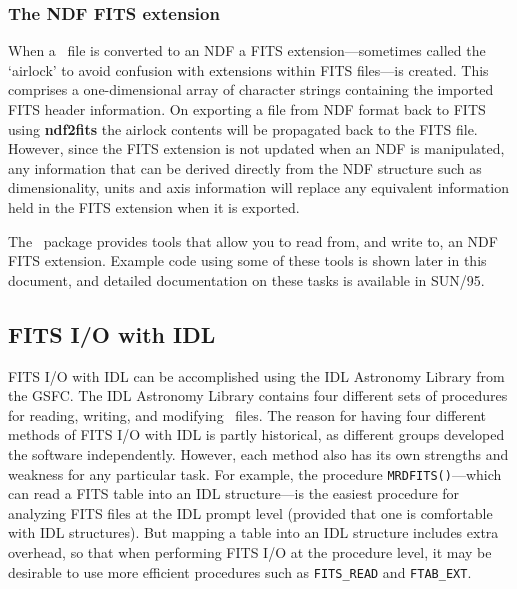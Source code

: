 \documentclass[twoside,11pt]{article}
\newcommand{\htmladdnormallink}[2]{#1}
\newcommand{\htmlref}[2]{#1}
\newcommand{\xref}[3]{#1}
\newcommand{\xlabel}[1]{}
\begin{document}
\subsubsection{The NDF FITS extension}

When a \FITSref\ file is converted to an \xref{NDF}{sun33}{} a FITS
extension---sometimes called the `airlock' to avoid confusion with
extensions within FITS files---is created.  This comprises a
one-dimensional array of character strings containing the imported
FITS header information.  On exporting a file from NDF format back to
FITS using \xref{{\bf ndf2fits}}{sun55}{NDF2FITS} the airlock contents
will be propagated back to the FITS file.  However, since the FITS
extension is not updated when an NDF is manipulated, any information
that can be derived directly from the NDF structure such as
dimensionality, units and axis information will replace any equivalent
information held in the FITS extension when it is exported.

The \KAPPAref\ package provides tools that allow you to read from, and
write to, an NDF FITS extension.  Example code using some of these
tools is shown later in this
\htmlref{document}{sc16_fitsheader}, and detailed documentation on these
tasks is available in \xref{SUN/95}{sun95}{se_fitsairlock}.

\subsection{\xlabel{sc16_fitsidl}FITS I/O with IDL\label{sc16_fitsidl}}

\htmladdnormallink{FITS
I/O}{http://idlastro.gsfc.nasa.gov/fitsio.html} with IDL can be
accomplished using the \htmladdnormallink{IDL Astronomy
Library}{http://idlastro.gsfc.nasa.gov/homepage.html} from the GSFC.
The IDL Astronomy Library contains four different sets of procedures
for reading, writing, and modifying \FITSref\ files.  The reason for having
four different methods of FITS I/O with IDL is partly historical, as
different groups developed the software independently.  However, each
method also has its own strengths and weakness for any particular
task.  For example, the procedure {\tt MRDFITS()}---which can read a
FITS table into an IDL structure---is the easiest procedure for
analyzing FITS files at the IDL prompt level (provided that one is
comfortable with IDL structures).  But mapping a table into an IDL
structure includes extra overhead, so that when performing FITS I/O at
the procedure level, it may be desirable to use more efficient
procedures such as {\tt FITS\_READ} and {\tt FTAB\_EXT}.
\end{document}

